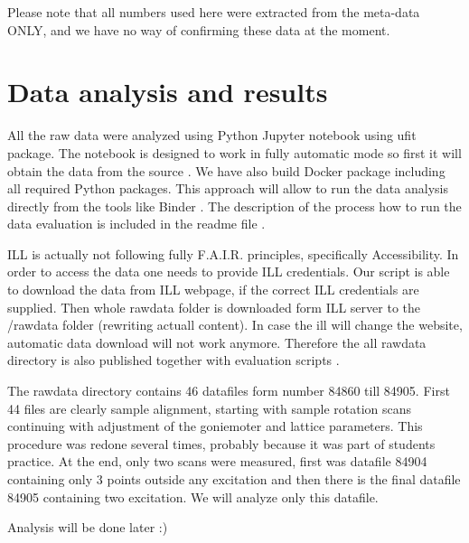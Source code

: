 \documentclass[aps,prx,reprint,amsmath,amssymb,superscriptaddress,showpacs]{revtex4-1}
\begin{document}
Please note that all numbers used here were extracted from the meta-data ONLY, and we have no way of confirming these data at the moment. 


\section{Data analysis and results}

All the raw data were analyzed using Python Jupyter notebook \cite{jupyter} using ufit \cite{ufit} package.
The notebook \cite{data-evaluation} is designed to work in fully automatic mode so first it will obtain the data from the source \cite{data}. We have also build Docker \cite{Docker} package \cite{docker-package} including all required Python packages. This approach will allow to run the data analysis directly from the tools like Binder \cite{binder}. The description of the process how to run the data evaluation is included in the readme file \cite{data-evaluation}.

ILL is actually not following fully F.A.I.R. principles, specifically Accessibility. In order to access the data one needs to provide ILL credentials. Our script is able to download the data from ILL webpage, if the correct ILL credentials are supplied. Then whole rawdata folder is downloaded form ILL server to the /rawdata folder (rewriting actuall content). In case the ill will change the website, automatic data download will not work anymore. Therefore the all rawdata directory is also published together with evaluation scripts \cite{data-evaluation}.

The rawdata directory contains 46 datafiles form number 84860 till 84905. First 44 files are clearly sample alignment, starting with sample rotation scans continuing with adjustment of the goniemoter and lattice parameters. This procedure was redone several times, probably because it was part of students practice.
At the end, only two scans were measured, first was datafile 84904 containing only 3 points outside any excitation and then there is the final datafile 84905 containing two excitation. We will analyze only this datafile.

Analysis will be done later :)
\end{document}
